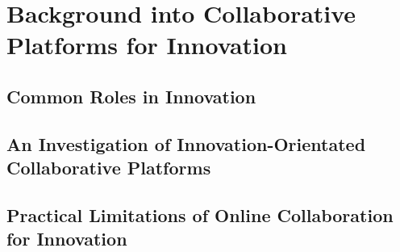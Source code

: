 \chapter{Background into Collaborative Platforms for Innovation}

\section{Common Roles in Innovation}

\section{An Investigation of Innovation-Orientated Collaborative Platforms}

\section{Practical Limitations of Online Collaboration for Innovation}